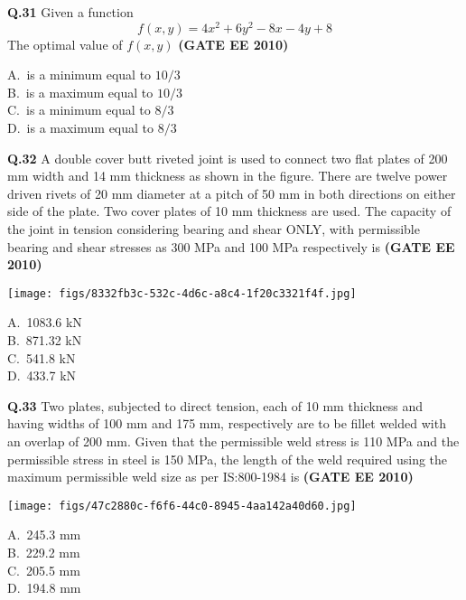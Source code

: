 \documentclass[journal,12pt,onecolumn]{exam}
\theoremstyle{remark}
\begin{document}
\noindent\textbf{Q.31} Given a function 
\[
f(x, y) = 4x^2 + 6y^2 - 8x - 4y + 8
\]
The optimal value of $f(x, y)$
\hfill\textbf{(GATE EE 2010)}
\begin{multicols}{4}
A.\ is a minimum equal to $10/3$ \\
B.\ is a maximum equal to $10/3$ \\
C.\ is a minimum equal to $8/3$ \\
D.\ is a maximum equal to $8/3$
\end{multicols}

\noindent\textbf{Q.32} A double cover butt riveted joint is used to connect two flat plates of 200 mm width and 14 mm thickness as shown in the figure. There are twelve power driven rivets of 20 mm diameter at a pitch of 50 mm in both directions on either side of the plate. Two cover plates of 10 mm thickness are used. The capacity of the joint in tension considering bearing and shear ONLY, with permissible bearing and shear stresses as 300 MPa and 100 MPa respectively is
\hfill\textbf{(GATE EE 2010)}

\begin{center}
\texttt{[image: figs/8332fb3c-532c-4d6c-a8c4-1f20c3321f4f.jpg]}
\end{center}

\begin{multicols}{4}
A.\ 1083.6 kN \\
B.\ 871.32 kN \\
C.\ 541.8 kN \\
D.\ 433.7 kN
\end{multicols}

\noindent\textbf{Q.33} Two plates, subjected to direct tension, each of 10 mm thickness and having widths of 100 mm and 175 mm, respectively are to be fillet welded with an overlap of 200 mm. Given that the permissible weld stress is 110 MPa and the permissible stress in steel is 150 MPa, the length of the weld required using the maximum permissible weld size as per IS:800-1984 is
\hfill\textbf{(GATE EE 2010)}
\begin{center}
\texttt{[image: figs/47c2880c-f6f6-44c0-8945-4aa142a40d60.jpg]}
\end{center}
\begin{multicols}{4}
A.\ 245.3 mm \\
B.\ 229.2 mm \\
C.\ 205.5 mm \\
D.\ 194.8 mm
\end{multicols}
\end{document}
